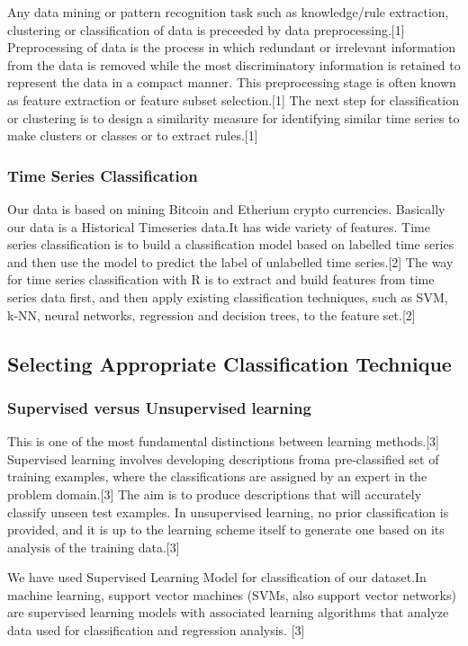 \documentclass{article}
\begin{document}
Any data mining or pattern recognition task such as
knowledge/rule extraction, clustering or classification of data is preceeded by data preprocessing.[1] Preprocessing of data is the process in which redundant or irrelevant information from the data is removed while the most discriminatory information is retained to represent the data in a compact manner. This preprocessing stage is often known as feature extraction or feature subset selection.[1] The next step for classification or clustering is to design a similarity measure for identifying similar time series to make clusters or classes or to extract rules.[1]

\subsubsection {Time Series Classification}
Our data is based on mining Bitcoin and Etherium crypto currencies. Basically our data is a Historical Timeseries data.It has wide variety of features.
Time series classification is to build a classification model based on labelled time series and then use the model to predict the label of unlabelled time series.[2] The way for time series classification with R is to extract and build features from time series data first, and then apply existing classification techniques, such as SVM, k-NN, neural networks, regression and decision trees, to the feature set.[2]

\subsection{Selecting Appropriate Classification
Technique }

\subsubsection {Supervised versus Unsupervised learning} This is one of the most fundamental distinctions between learning methods.[3] Supervised learning involves developing descriptions froma pre-classified set of training examples, where the classifications are assigned by an expert in the problem domain.[3] The aim is to produce descriptions that will accurately classify unseen test examples. In unsupervised learning, no prior classification is provided, and it is up to the learning scheme itself to generate one based on its analysis of the training data.[3] \newline

We have used Supervised Learning Model for classification of our dataset.In machine learning, support vector machines (SVMs, also support vector networks) are supervised learning models with associated learning algorithms that analyze data used for classification and regression analysis. [3]
\end{document}
